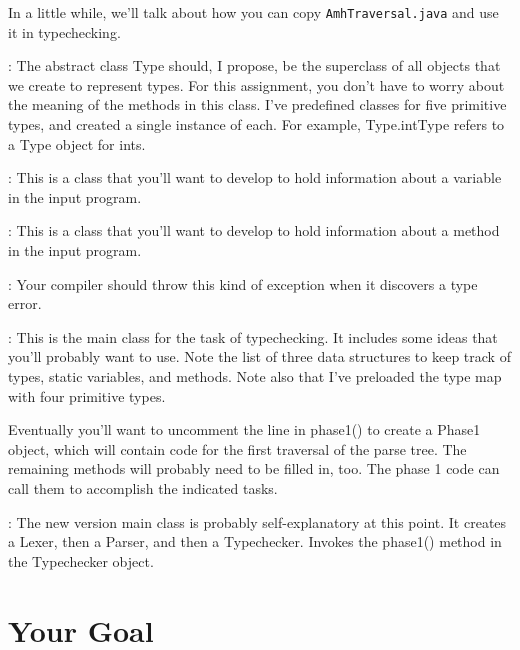 \documentclass[11pt]{article}
\begin{document}
In a little while, we'll talk about how you can copy \verb'AmhTraversal.java' and use it in typechecking.

\mbox{}\par{}: 
The abstract class Type should, I propose, be the superclass of all objects that we create to represent types.  For this assignment, you don't have to worry about the meaning of the methods in this class.  I've predefined classes for five primitive types, and created a single instance of each.  For example, Type.intType refers to a Type object for ints.

\mbox{}\par{}:  This is a class that you'll want to develop to hold information about a variable in the input program.

\mbox{}\par{}:  This is a class that you'll want to develop to hold information about a method in the input program.

\mbox{}\par{}:  Your compiler should throw this kind of exception when it discovers a type error.

\mbox{}\par{}:  This is the main class for the task of typechecking.  It includes some ideas that you'll probably want to use.  Note the list of three data structures to keep track of types, static variables, and methods.  Note also that I've preloaded the type map with four primitive types.

Eventually you'll want to uncomment the line in phase1() to create a Phase1 object, which will contain code for the first traversal of the parse tree.  The remaining methods will probably need to be filled in, too.  The phase 1 code can call them to accomplish the indicated tasks.

\mbox{}\par{}:  The new version main class is probably self-explanatory at this point.  It creates a Lexer, then a Parser, and then a Typechecker.  Invokes the phase1() method in the Typechecker object.

\section{Your Goal}
\end{document}
